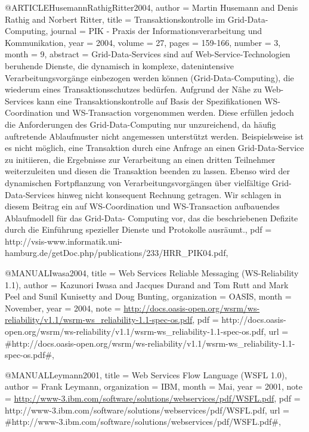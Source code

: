 @ARTICLE{HusemannRathigRitter2004,
  author = {Martin Husemann and Denis Rathig and Norbert Ritter},
  title = {{Transaktionskontrolle im Grid-Data-Computing}},
  journal = {PIK - Praxis der Informationsverarbeitung und Kommunikation},
  year = {2004},
  volume = {27},
  pages = {159-166},
  number = {3},
  month = {9},
  abstract = {Grid-Data-Services sind auf Web-Service-Technologien beruhende
Dienste,
	die dynamisch in komplexe, datenintensive Verarbeitungsvorgänge
einbezogen
	werden können (Grid-Data-Computing), die wiederum eines
Transaktionsschutzes
	bedürfen. Aufgrund der Nähe zu Web-Services kann eine
Transaktionskontrolle
	auf Basis der Spezifikationen WS-Coordination
und WS-Transaction
	vorgenommen werden. Diese erfüllen jedoch die
Anforderungen des Grid-Data-Computing
	nur unzureichend, da häufig auftretende
Ablaufmuster nicht angemessen
	unterstützt werden. Beispielsweise
ist es nicht möglich, eine Transaktion
	durch eine Anfrage an einen
Grid-Data-Service zu initiieren, die
	Ergebnisse zur Verarbeitung an
einen dritten Teilnehmer weiterzuleiten
	und diesen die Transaktion
beenden zu lassen. Ebenso wird der dynamischen
	Fortpflanzung von
Verarbeitungsvorgängen über vielfältige Grid-Data-Services
	hinweg
nicht konsequent Rechnung getragen. Wir schlagen in diesem
	Beitrag
ein auf WS-Coordination und WS-Transaction aufbauendes Ablaufmodell
für
	das Grid-Data- Computing vor, das die beschriebenen Defizite
durch
	die Einführung spezieller Dienste und Protokolle ausräumt.},
  pdf = {http://vsis-www.informatik.uni-hamburg.de/getDoc.php/publications/233/HRR_PIK04.pdf},
}

@MANUAL{Iwasa2004,
  title = {{Web Services Reliable Messaging (WS-Reliability 1.1)}},
  author = {Kazunori Iwasa and Jacques Durand and Tom Rutt and Mark Peel and
	Sunil Kunisetty and Doug Bunting},
  organization = {OASIS},
  month = {November},
  year = {2004},
  note = {\url{http://docs.oasis-open.org/wsrm/ws-reliability/v1.1/wsrm-ws_reliability-1.1-spec-os.pdf}},
  pdf = {http://docs.oasis-open.org/wsrm/ws-reliability/v1.1/wsrm-ws_reliability-1.1-spec-os.pdf},
  url = {#http://docs.oasis-open.org/wsrm/ws-reliability/v1.1/wsrm-ws_reliability-1.1-spec-os.pdf#},
}

@MANUAL{Leymann2001,
  title = {{Web Services Flow Language (WSFL 1.0)}},
  author = {Frank Leymann},
  organization = {IBM},
  month = {Mai},
  year = {2001},
  note = {\url{http://www-3.ibm.com/software/solutions/webservices/pdf/WSFL.pdf}},
  pdf = {http://www-3.ibm.com/software/solutions/webservices/pdf/WSFL.pdf},
  url = {#http://www-3.ibm.com/software/solutions/webservices/pdf/WSFL.pdf#},
}


